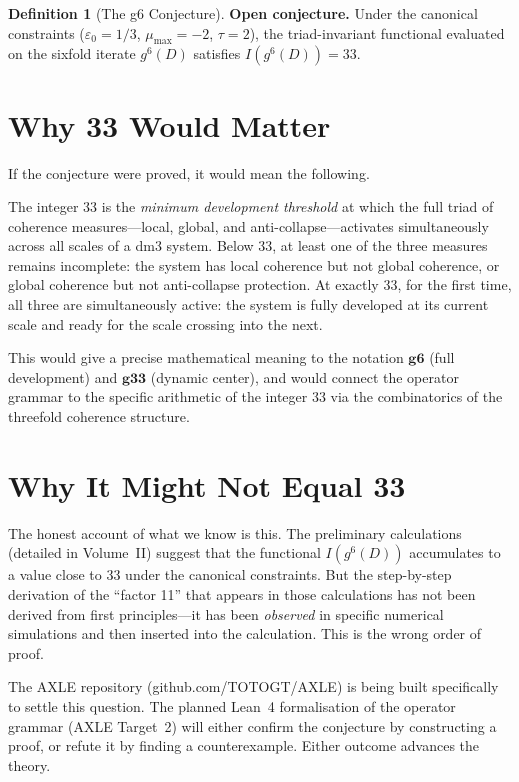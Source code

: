 \documentclass[12pt, oneside]{book}
\theoremstyle{plain}
\theoremstyle{definition}
\newtheorem{definition}{Definition}[chapter]
\theoremstyle{remark}
\begin{document}
\begin{definition}[The g6 Conjecture]\label{def:g6conj}
\textbf{Open conjecture.} Under the canonical constraints
($\varepsilon_0 = 1/3$, $\mu_{\max} = -2$, $\tau = 2$), the
triad-invariant functional evaluated on the sixfold iterate
$g^6(D)$ satisfies $I(g^6(D)) = 33$.
\end{definition}

\section{Why 33 Would Matter}

If the conjecture were proved, it would mean the following.

The integer 33 is the \emph{minimum development threshold} at
which the full triad of coherence measures---local, global,
and anti-collapse---activates simultaneously across all scales
of a dm3 system. Below 33, at least one of the three measures
remains incomplete: the system has local coherence but not
global coherence, or global coherence but not anti-collapse
protection. At exactly 33, for the first time, all three are
simultaneously active: the system is fully developed at its
current scale and ready for the scale crossing into the next.

This would give a precise mathematical meaning to the notation
$\mathbf{g6}$ (full development) and $\mathbf{g33}$ (dynamic
center), and would connect the operator grammar to the specific
arithmetic of the integer 33 via the combinatorics of the
threefold coherence structure.

\section{Why It Might Not Equal 33}

The honest account of what we know is this. The preliminary
calculations (detailed in Volume~II) suggest that the functional
$I(g^6(D))$ accumulates to a value close to 33 under the
canonical constraints. But the step-by-step derivation of
the ``factor 11'' that appears in those calculations has not
been derived from first principles---it has been \emph{observed}
in specific numerical simulations and then inserted into the
calculation. This is the wrong order of proof.

The AXLE repository (github.com/TOTOGT/AXLE) is being built
specifically to settle this question. The planned Lean~4
formalisation of the operator grammar (AXLE Target~2) will
either confirm the conjecture by constructing a proof, or
refute it by finding a counterexample. Either outcome advances
the theory.
\end{document}
